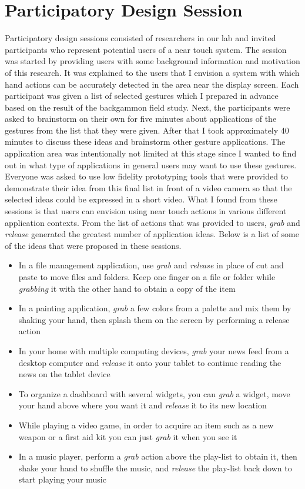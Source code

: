 \section{Participatory Design Session}
Participatory design sessions consisted of researchers in our lab and invited participants who represent potential users of a near touch system. 
The session was started by providing users with some background information and motivation of this research.
It was explained to the users that I envision a system with which hand actions can be accurately detected in the area near the display screen.
Each participant was given a list of selected gestures which I prepared in advance based on the result of the backgammon field study. 
Next, the participants were asked to brainstorm on their own for five minutes about applications of the gestures from the list that they were given. 
After that I took approximately 40 minutes to discuss these ideas and brainstorm other gesture applications. 
The application area was intentionally not limited at this stage since I wanted to find out in what type of applications in general users may want to use these gestures.
Everyone was asked to use low fidelity prototyping tools that were provided to demonstrate their idea from this final list in front of a video camera so that the selected ideas could be expressed in a short video.
What I found from these sessions is that users can envision using near touch actions in various different application contexts.
From the list of actions that was provided to users, \textit{grab} and
\textit{release} generated the greatest number of application ideas.
Below is a list of some of the ideas that were proposed in these
sessions.
\begin{itemize}
 \item In a file management application, use \textit{grab} and \textit{release} in place of cut and paste to move files and folders. Keep one finger on a file or folder while \textit{grabbing} it with the other hand to obtain a copy of the item
 \item In a painting application, \textit{grab} a few colors from a palette and mix them by shaking your hand, then splash them on the screen by performing a release action
 \item In your home with multiple computing devices, \textit{grab} your news
feed from a desktop computer and \textit{release} it onto your tablet to
continue reading the news on the tablet device
 \item To organize a dashboard with several widgets, you can \textit{grab} a widget, move your hand above where you want it and \textit{release} it to its new location
 \item While playing a video game, in order to acquire an item such as a new weapon or a first aid kit you can just \textit{grab} it when you see it
 \item In a music player, perform a \textit{grab} action above the play-list to obtain it, then shake your hand to shuffle the music, and \textit{release} the play-list back down to start playing your music
\end{itemize}
